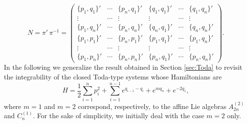 \documentclass[12pt]{article}
\begin{document}
\begin{equation}
N=%
{\pi'}%
\,%
\pi%
^{-1}=
\left( \begin {array}{ccc|ccc}
        \lbrace p_1,q_1\rbrace' &  \cdots &\lbrace p_n,q_1\rbrace' &\lbrace q_1,q_1\rbrace' &\cdots & \lbrace q_1,q_n\rbrace'\\
        \vdots & \cdots  & \vdots & \vdots &\cdots & \vdots\\
        \lbrace p_1,q_n\rbrace' &  \cdots &\lbrace p_n,q_n\rbrace' &\lbrace q_n,q_1\rbrace' &\cdots & \lbrace q_n,q_n\rbrace'\\
       \hline
        \lbrace p_1,p_1\rbrace'  & \cdots &\lbrace p_n,p_1\rbrace' &\lbrace p_1,q_1\rbrace' &\cdots & \lbrace p_1,q_n\rbrace'\\
        \vdots & \cdots & \vdots & \vdots &\cdots & \vdots\\
        \lbrace p_1,p_n\rbrace' & \cdots &\lbrace p_n,p_n\rbrace' &\lbrace p_n,q_1\rbrace' &\cdots & \lbrace p_n,q_n\rbrace'
        \label{eq: matrix tensor Cn}
\end{array}\right).
\end{equation}
In the following we generalize the result obtained in Section \ref{sec:Toda} to revisit the integrability of the closed 
Toda-type systems whose Hamiltonians are
\begin{equation}\label{eq: periodic Hamiltonians}
        H=\frac{1}{2}\sum_{i=1}^np_i^2+\sum_{i=1}^{n-1}e^{q_{i-1}-q_i}+e^{mq_n}+e^{-2q_1},
\end{equation}
where $m=1$ and $m=2$ correspond, respectively, to the affine Lie algebras $A_{2n}^{(2)}$ and $C_{n}^{(1)}$.
For the sake of simplicity, we initially deal with the case $m=2$ only.
\end{document}
